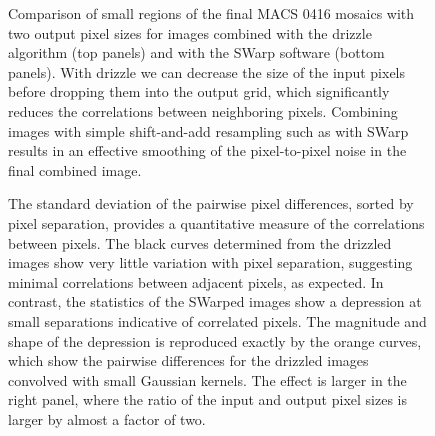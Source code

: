 \documentclass[preprint2]{aastex6}
\begin{document}
\begin{figure}[!t]
\caption{Comparison of small regions of the final MACS 0416 mosaics with two output pixel sizes for images combined with the drizzle algorithm (top panels) and with the SWarp software (bottom panels).  With drizzle we can decrease the size of the input pixels before dropping them into the output grid, which significantly reduces the correlations between neighboring pixels.  Combining images with simple shift-and-add resampling such as with SWarp results in an effective smoothing of the pixel-to-pixel noise in the final combined image. 
\label{fig:drizzle_cutout}}  
\end{figure}

\begin{figure}[!t]
\caption{The standard deviation of the pairwise pixel differences, sorted by pixel separation, provides a quantitative measure of the correlations between pixels.  The black curves determined from the drizzled images show very little variation with pixel separation, suggesting minimal correlations between adjacent pixels, as expected.  In contrast, the statistics of the SWarped images show a depression at small separations indicative of correlated pixels.  The magnitude and shape of the depression is reproduced exactly by the orange curves, which show the pairwise differences for the drizzled images convolved with small Gaussian kernels.  The effect is larger in the right panel, where the ratio of the input and output pixel sizes is larger by almost a factor of two.
\label{fig:corr_noise}}  
\end{figure}
\end{document}
